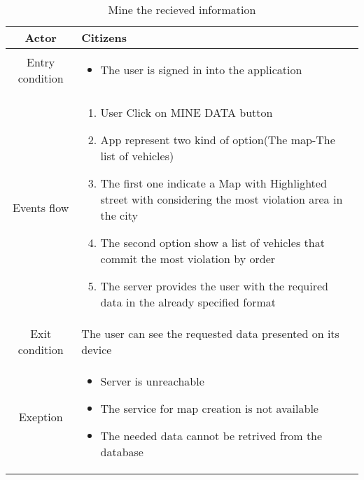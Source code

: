 \documentclass{article}
\begin{document}
		\begin{table} [H]
		\begin{center}
		\caption{Mine the recieved information}
		\begin{tabular}{|c|p{8cm}|}
			\hline
			Actor&Citizens\\
			\hline
			Entry condition& \begin{itemize}
								\item The user is signed in into the application
							\end{itemize}\\
			\hline
			 Events flow& \begin{enumerate}
							\item User Click on MINE DATA button			
							\item App represent two kind of option(The map-The list of vehicles)
							\item The first one indicate a Map with Highlighted street with considering the most violation area in the city
							\item The second option show a list of vehicles that commit the most violation by order %
							\item The server provides the user with the required data in the already specified format
						\end{enumerate}\\
			\hline
			Exit condition & The user can see the requested data presented on its device\\
			\hline
			Exeption& \begin{itemize}
						\item Server is unreachable
						\item The service for map creation is not available
						\item The needed data cannot be retrived from the database
					\end{itemize}\\
			\hline
		\end{tabular}
		\end{center}
		\end{table} 
		
\end{document}
